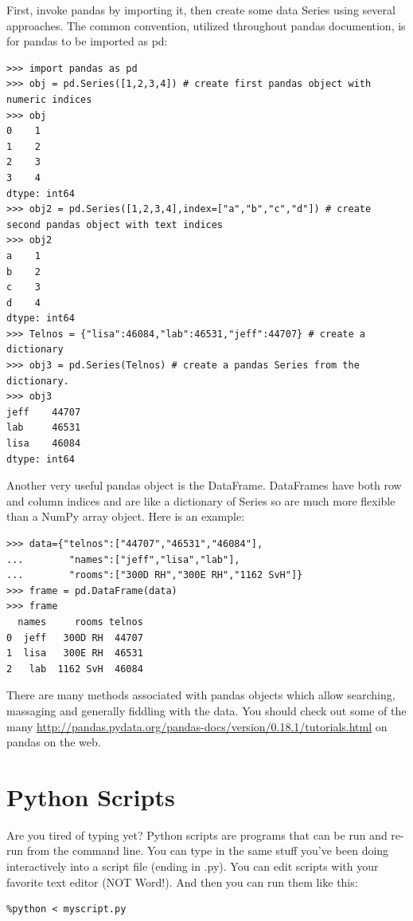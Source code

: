 \documentclass[11pt]{book}
\begin{document}
{{{{First, invoke pandas by importing it, then create some data Series using several approaches. The common convention, utilized throughout pandas documention, is for pandas to be imported as pd:

{ \color{blue} \begin{verbatim}
>>> import pandas as pd
>>> obj = pd.Series([1,2,3,4]) # create first pandas object with numeric indices
>>> obj
0    1
1    2
2    3
3    4
dtype: int64
>>> obj2 = pd.Series([1,2,3,4],index=["a","b","c","d"]) # create second pandas object with text indices
>>> obj2
a    1
b    2
c    3
d    4
dtype: int64
>>> Telnos = {"lisa":46084,"lab":46531,"jeff":44707} # create a dictionary
>>> obj3 = pd.Series(Telnos) # create a pandas Series from the dictionary.
>>> obj3
jeff    44707
lab     46531
lisa    46084
dtype: int64
\end{verbatim}}

Another very useful pandas object is the DataFrame.  DataFrames have both row and column indices and are like a dictionary of Series so are much more flexible than a NumPy array object.   Here is an example:

{ \color{blue} \begin{verbatim}
>>> data={"telnos":["44707","46531","46084"],
...        "names":["jeff","lisa","lab"],
...        "rooms":["300D RH","300E RH","1162 SvH"]}
>>> frame = pd.DataFrame(data)
>>> frame
  names     rooms telnos
0  jeff   300D RH  44707
1  lisa   300E RH  46531
2   lab  1162 SvH  46084
 \end{verbatim}}

There are many methods associated with pandas objects which allow searching, massaging and generally fiddling with the data. You should check out some of the many \href{tutorials}{http://pandas.pydata.org/pandas-docs/version/0.18.1/tutorials.html} on pandas on the web.

\section{Python Scripts}

Are you tired of typing yet? Python scripts are programs that can be run and re-run from the command line.
You can type in the same stuff you've been doing interactively into a script file (ending in .py). You can edit scripts with your favorite text editor (NOT Word!).   And then you can run them like this:

{ \color{blue} \begin{verbatim}
%python < myscript.py
\end{verbatim}}

}}}}
\end{document}
